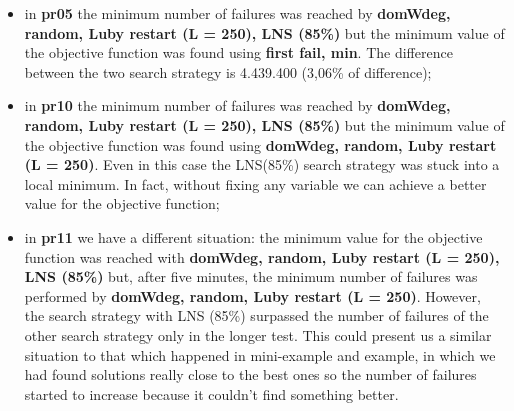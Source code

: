 \begin{itemize}
    \item in \textbf{pr05} the minimum number of failures was reached by \textbf{domWdeg, random, Luby restart (L = 250), LNS (85\%)} but the minimum value of the objective function was found using \textbf{first fail, min}. The difference between the two search strategy is 4.439.400 (3,06\% of difference);
    \item in \textbf{pr10} the minimum number of failures was reached by \textbf{domWdeg, random, Luby restart (L = 250), LNS (85\%)} but the minimum value of the objective function was found using \textbf{domWdeg, random, Luby restart (L = 250)}. Even in this case the LNS(85\%) search strategy was stuck into a local minimum. In fact, without fixing any variable we can achieve a better value for the objective function;
    \item in \textbf{pr11} we have a different situation: the minimum value for the objective function was reached with \textbf{domWdeg, random, Luby restart (L = 250), LNS (85\%)} but, after five minutes, the minimum number of failures was performed by \textbf{domWdeg, random, Luby restart (L = 250)}. However, the search strategy with LNS (85\%) surpassed the number of failures of the other search strategy only in the longer test. This could present us a similar situation to that which happened in mini-example and example, in which we had found solutions really close to the best ones so the number of failures started to increase because it couldn't find something better. 
\end{itemize}
